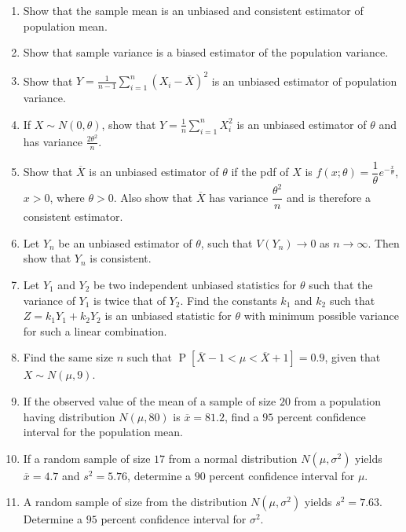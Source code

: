 \documentclass[svgnames]{amsart}
\DeclareMathOperator{\Prob}{P}
\begin{document}
\begin{enumerate}[leftmargin=*, itemsep=2mm]
\item Show that the sample mean is an unbiased and consistent estimator of population mean.

\item Show that sample variance is a biased estimator of the population variance.

\item Show that $Y = \frac{1}{n - 1} \sum_{i = 1}^n (X_i - \overline X)^2$ is an unbiased estimator of population variance.

\item If $X \sim N(0, \theta)$, show that $Y = \frac 1 n \sum_{i=1}^n X_i^2$ is an unbiased estimator of $\theta$ and has variance $\frac {2\theta^2} n$.

\item Show that $\overline X$ is an unbiased estimator of $\theta$ if the pdf of $X$ is $f(x; \theta) = \dfrac 1 \theta e^{-\frac x \theta}$, $x > 0$, where $\theta > 0$. Also show that $\overline X$ has variance $\dfrac {\theta^2} n$ and is therefore a consistent estimator.

\item Let $Y_n$ be an unbiased estimator of $\theta$, such that $V(Y_n) \to 0$ as $n \to \infty$. Then show that $Y_n$ is consistent.

\item Let $Y_1$ and $Y_2$ be two independent unbiased statistics for $\theta$ such that the variance of $Y_1$ is twice that of $Y_2$. Find the constants $k_1$ and $k_2$ such that $Z = k_1 Y_1 + k_2 Y_2$ is an unbiased statistic for $\theta$ with minimum possible variance for such a linear combination.

\item Find the same size $n$ such that $\Prob[\overline X - 1 < \mu < \overline X + 1] = 0.9$, given that $X \sim N(\mu, 9)$.

\item If the observed value of the mean of a sample of size $20$ from a population having distribution $N(\mu, 80)$ is $\overline x = 81.2$, find a $95$ percent confidence interval for the population mean.

\item If a random sample of size $17$ from a normal distribution $N(\mu, \sigma^2)$ yields $\overline x = 4.7$ and $s^2 = 5.76$, determine a $90$ percent confidence interval for $\mu$.

\item A random sample of size from the distribution $N(\mu, \sigma^2)$ yields $s^2 = 7.63$. Determine a $95$ percent confidence interval for $\sigma^2$.


\end{enumerate}
\end{document}
